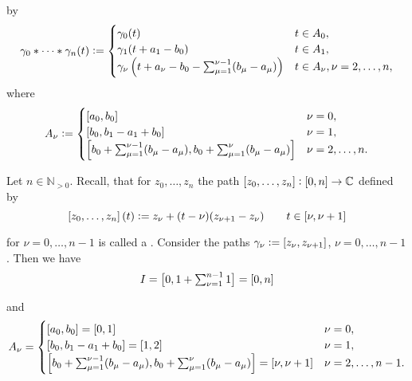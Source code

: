 \begin{enumerate}[label = \textbf{Exercise \arabic*.},wide = 0pt, itemsep=1.5ex]
\begin{enumerate}[label = (\alph*),wide = 0pt, itemsep=1.5ex]
			\noindent by
			\begin{align*}
				\gamma_0 \ast \dots \ast \gamma_n(t) := \begin{cases}
					\gamma_0(t) & t \in A_0,\\
					\gamma_1(t + a_1 - b_0) & t \in A_1,\\
					\gamma_\nu\del{t + a_\nu - b_0 - \sum_{\mu = 1}^{\nu-1} (b_\mu - a_\mu)} & t \in A_\nu, \nu = 2,\dots,n,
				\end{cases}
			\end{align*}
			\noindent where 
			\begin{align*}
				A_\nu:= \begin{cases}
					\intcc{a_0,b_0} & \nu = 0,\\
					\intcc{b_0,b_1 - a_1 + b_0} & \nu = 1,\\
					\intcc{b_0 + \sum_{\mu = 1}^{\nu-1} (b_\mu - a_\mu),b_0 + \sum_{\mu = 1}^{\nu}(b_\mu - a_\mu)} & \nu = 2,\dots,n.
				\end{cases}
			\end{align*}

			Let $n \in \mathbb{N}_{> 0}$. Recall, that for $z_0,\dots,z_n$ the path $\intcc{z_0,\dots,z_n}: \intcc{0,n} \to \mathbb{C}$ defined by 
			\begin{equation}
				\intcc{z_0,\dots,z_n}(t) := z_\nu + (t - \nu)(z_{\nu + 1} - z_\nu) \qquad t \in \intcc{\nu, \nu + 1}
			\end{equation}

			\noindent for $\nu = 0,\dots,n - 1$ is called a . Consider the paths $\gamma_\nu := \intcc{z_\nu,z_{\nu + 1}}$, $\nu = 0,\dots,n-1$. Then we have
			\begin{equation}
				\textstyle I = \intcc[1]{0, 1 + \sum_{\nu = 1}^{n - 1}1} = \intcc{0,n}
			\end{equation}

			\noindent and
			\begin{align*}
				A_\nu = \begin{cases}
					\intcc{a_0,b_0} = \intcc{0,1} & \nu = 0,\\
					\intcc{b_0,b_1 - a_1 + b_0} = \intcc{1,2} & \nu = 1,\\
					\intcc{b_0 + \sum_{\mu = 1}^{\nu-1} (b_\mu - a_\mu),b_0 + \sum_{\mu = 1}^{\nu}(b_\mu - a_\mu)} = \intcc{\nu,\nu + 1} & \nu = 2,\dots,n - 1.
				\end{cases}
			\end{align*}


\end{enumerate}
\end{enumerate}
